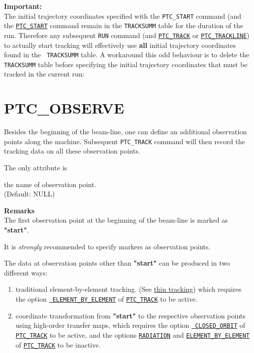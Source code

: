 {\bf Important:} \\
The initial trajectory coordinates specified with the {\tt PTC\_START} command 
(and the \hyperref[sec:ptc-start]{\tt PTC\_START} command remain in the 
{\tt TRACKSUMM} table for the duration of the \madx run. 
Therefore any subsequent {\tt RUN} command 
(and \hyperref[sec:ptc-track]{\tt PTC\_TRACK} or 
\hyperref[sec:ptc-trackline]{\tt PTC\_TRACKLINE}) to actually start tracking 
will effectively use {\bf all} initial trajectory coordinates found in the {\tt 
TRACKSUMM} table.
A workaround this odd behaviour is to delete the {\tt TRACKSUMM} table before 
specifying the initial trajectory coordinates that must be tracked in the 
current run:



\section{PTC\_OBSERVE} 
\label{sec:ptc-observe}

Besides the beginning of the beam-line, one can define an additional
observation points along the machine. Subsequent \texttt{PTC\_TRACK}
command will then record the tracking data on all these observation
points.  


The only attribute is 
\begin{madlist}
   the name of observation point.  \\ (Default: NULL)
\end{madlist}


{\bf Remarks}\\
The first observation point at the beginning of the beam-line is marked
as {\bf "start"}.  
       
It is {\em strongly} recommended to specify markers as observation points.

The data at observation points other than {\bf "start"} can be produced
in two different ways:
\begin{enumerate}
  \item traditional element-by-element tracking. (See
    \hyperref[chap:thintrack]{\madx thin tracking}) which 
    requires the option \hyperref[opt:element-by-element]{\tt
      ELEMENT\_BY\_ELEMENT} of \hyperref[sec:ptc-track]{\tt PTC\_TRACK} to
    be active.

  \item coordinate transformation from {\bf "start"} to the
  respective observation points using high-order \ptc transfer
  maps, which requires the option \hyperref[opt:closed-orbit]{\tt
    CLOSED\_ORBIT} of \hyperref[sec:ptc-track]{\tt PTC\_TRACK} to be
  active, and the options \hyperref[opt:radiation]{\tt RADIATION}
  and \hyperref[opt:element-by-element]{\tt ELEMENT\_BY\_ELEMENT} of
  \hyperref[sec:ptc-track]{\tt PTC\_TRACK} to be inactive.
\end{enumerate} 


